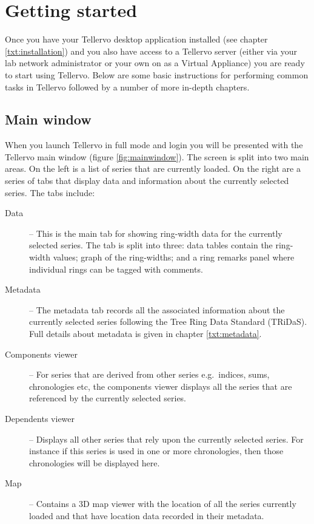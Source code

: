 
\chapter{Getting started}
\label{txt:gettingstarted}

Once you have your Tellervo desktop application installed (see chapter \ref{txt:installation}) and you also have access to a Tellervo server (either via your lab network administrator or your own on as a Virtual Appliance) you are ready to start using Tellervo.  Below are some basic instructions for performing common tasks in Tellervo followed by a number of more in-depth chapters.

\section{Main window}

When you launch Tellervo in full mode and login you will be presented with the Tellervo main window (figure \ref{fig:mainwindow}).  The screen is split into two main areas.  On the left is a list of series that are currently loaded.  On the right are a series of tabs that display data and information about the currently selected series.  The tabs include:  

\begin{description}
\item[Data] -- This is the main tab for showing ring-width data for the currently selected series.  The tab is split into three: data tables contain the ring-width values; graph of the ring-widths; and a ring remarks panel where individual rings can be tagged with comments.
\item[Metadata] -- The metadata tab records all the associated information about the currently selected series following the Tree Ring Data Standard (TRiDaS).  Full details about metadata is given in chapter \ref{txt:metadata}.
\item[Components viewer] -- For series that are derived from other series e.g.\ indices, sums, chronologies etc, the components viewer displays all the series that are referenced by the currently selected series.
\item[Dependents viewer] -- Displays all other series that rely upon the currently selected series.  For instance if this series is used in one or more chronologies, then those chronologies will be displayed here.
\item[Map] -- Contains a 3D map viewer with the location of all the series currently loaded and that have location data recorded in their metadata.
\end{description}

